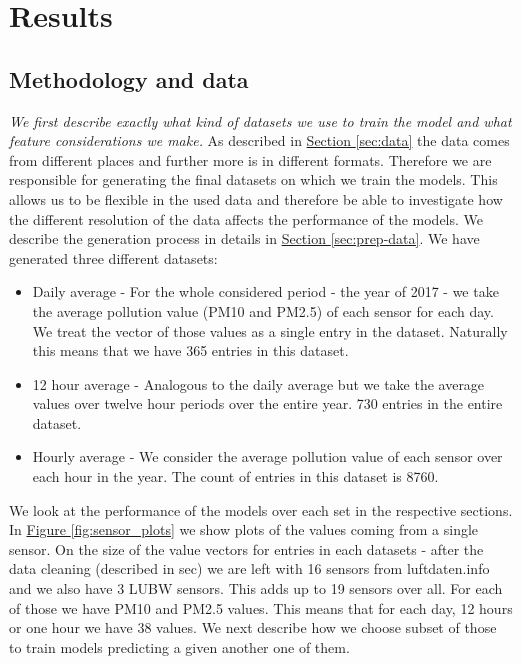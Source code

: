 \documentclass[12pt,a4paper,twoside]{scrartcl}
\numberwithin{equation}{section}
\newcommand{\reffig}[1]{\hyperref[#1]{Figure \ref*{#1}}}
\newcommand{\refsec}[1]{\hyperref[#1]{Section \ref*{#1}}}
\begin{document}
\section{Results}
\label{sec:res}
\subsection{Methodology and data}
\label{sec:meth}
\noindent
\emph{We first describe exactly what kind of datasets we use to train the model and what feature considerations we make.}
As described in \refsec{sec:data} the data comes from different places and further more is in different formats. Therefore we are responsible for generating the final datasets on which we train the models. This allows us to be flexible in the used data and therefore be able to investigate how the different resolution of the data affects the performance of the models. We describe the generation process in details in \refsec{sec:prep-data}. We have generated three different datasets:
\begin{itemize}
\item Daily average - For the whole considered period - the year of 2017 - we take the average pollution value (PM10 and PM2.5) of each sensor for each day. We treat the vector of those values as a single entry in the dataset. Naturally this means that we have 365 entries in this dataset.
\item 12 hour average - Analogous to the daily average but we take the average values over twelve hour periods over the entire year. 730 entries in the entire dataset.
\item Hourly average - We consider the average pollution value of each sensor over each hour in the year. The count of entries in this dataset is 8760.
\end{itemize}
We look at the performance of the models over each set in the respective sections. In \reffig{fig:sensor_plots} we show plots of the values coming from a single sensor. On the size of the value vectors for entries in each datasets - after the data cleaning (described in sec) we are left with 16 sensors from luftdaten.info and we also have 3 LUBW sensors. This adds up to 19 sensors over all. For each of those we have PM10 and PM2.5 values. This means that for each day, 12 hours or one hour we have 38 values. We next describe how we choose subset of those to train models predicting a given another one of them.
\end{document}
